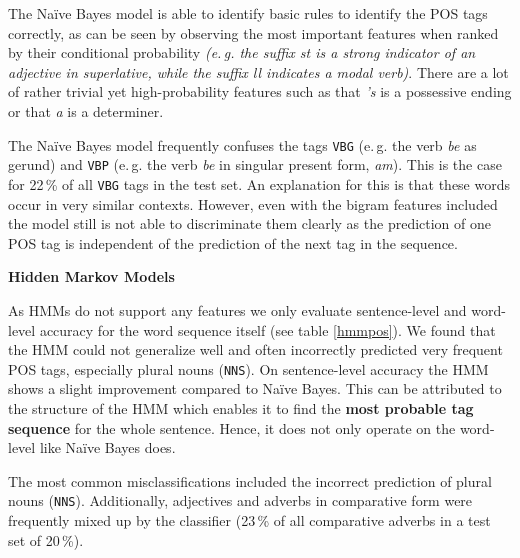\documentclass[twocolumns]{IEEEtran}
\begin{document}
The Na\"ive Bayes model is able to identify basic rules to identify the POS tags correctly, as can be seen by observing the most important features when ranked by their conditional probability \textit{(e.\,g. the suffix \textit{st} is a strong indicator of an adjective in superlative, while the suffix \textit{ll} indicates a modal verb)}. There are a lot of rather trivial yet high-probability features such as that \textit{'s} is a possessive ending or that \textit{a} is a determiner.

The Na\"ive Bayes model frequently confuses the tags \texttt{VBG} (e.\,g. the verb \textit{be} as gerund) and \texttt{VBP} (e.\,g. the verb \textit{be} in singular present form, \textit{am}). This is the case for 22\,\% of all \texttt{VBG} tags in the test set. An explanation for this is that these words occur in very similar contexts. However, even with the bigram features included the model still is not able to discriminate them clearly as the prediction of one POS tag is independent of the prediction of the next tag in the sequence.

\vspace*{3mm}
\colorbox{gray!30}{\textbf{Hidden Markov Models}}

As HMMs do not support any features we only evaluate sentence-level and word-level accuracy for the word sequence itself (see table \ref{hmmpos}). We found that the HMM could not generalize well and often incorrectly predicted very frequent POS tags, especially plural nouns (\texttt{NNS}). On sentence-level accuracy the HMM shows a slight improvement compared to Na\"ive Bayes. This can be attributed to the structure of the HMM which enables it to find the \textbf{most probable tag sequence} for the whole sentence. Hence, it does not only operate on the word-level like Na\"ive Bayes does.

The most common misclassifications included the incorrect prediction of plural nouns (\texttt{NNS}). Additionally, adjectives and adverbs in comparative form were frequently mixed up by the classifier (23\,\% of all comparative adverbs in a test set of 20\,\%).

\begin{table}[h]
    \centering
    \caption{POS Performance Evaluation of HMM}\label{hmmpos}
\end{table}
\end{document}
